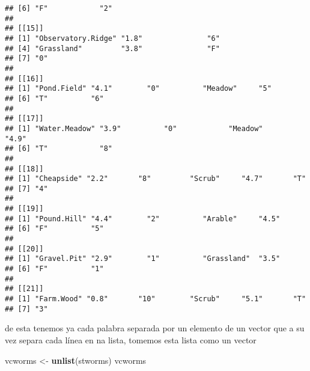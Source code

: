\documentclass[]{article}
\newenvironment{Shaded}{\begin{snugshade}}{\end{snugshade}}
\newcommand{\KeywordTok}[1]{\textcolor[rgb]{0.13,0.29,0.53}{\textbf{#1}}}
\newcommand{\StringTok}[1]{\textcolor[rgb]{0.31,0.60,0.02}{#1}}
\newcommand{\NormalTok}[1]{#1}
\begin{document}
\begin{verbatim}
## [6] "F"            "2"           
## 
## [[15]]
## [1] "Observatory.Ridge" "1.8"               "6"                
## [4] "Grassland"         "3.8"               "F"                
## [7] "0"                
## 
## [[16]]
## [1] "Pond.Field" "4.1"        "0"          "Meadow"     "5"         
## [6] "T"          "6"         
## 
## [[17]]
## [1] "Water.Meadow" "3.9"          "0"            "Meadow"       "4.9"         
## [6] "T"            "8"           
## 
## [[18]]
## [1] "Cheapside" "2.2"       "8"         "Scrub"     "4.7"       "T"        
## [7] "4"        
## 
## [[19]]
## [1] "Pound.Hill" "4.4"        "2"          "Arable"     "4.5"       
## [6] "F"          "5"         
## 
## [[20]]
## [1] "Gravel.Pit" "2.9"        "1"          "Grassland"  "3.5"       
## [6] "F"          "1"         
## 
## [[21]]
## [1] "Farm.Wood" "0.8"       "10"        "Scrub"     "5.1"       "T"        
## [7] "3"
\end{verbatim}

de esta tenemos ya cada palabra separada por un elemento de un vector
que a su vez separa cada línea en na lista, tomemos esta lista como un
vector

\begin{Shaded}
\begin{Highlighting}[]
\NormalTok{vcworms <-}\StringTok{ }\KeywordTok{unlist}\NormalTok{(stworms)}
\NormalTok{vcworms}
\end{Highlighting}
\end{Shaded}
\end{document}
